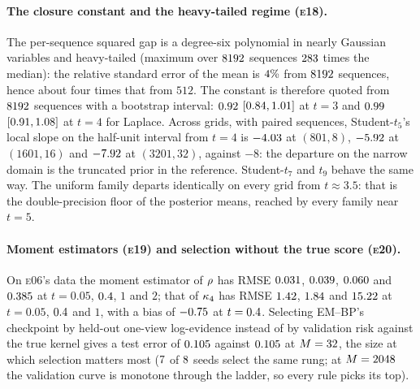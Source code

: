 \paragraph{The closure constant and the heavy-tailed regime (\textsc{e18}).}
The per-sequence squared gap is a degree-six polynomial in nearly Gaussian variables and
heavy-tailed (maximum over $8192$ sequences
$283$ times the median): the relative standard error of
the mean is $4\%$ from $8192$ sequences, hence about
four times that from $512$. The constant is therefore quoted from $8192$
sequences with a bootstrap interval:
$0.92$ $[0.84,1.01]$ at
$t=3$ and $0.99$ $[0.91,1.08]$
at $t=4$ for Laplace. Across grids, with paired sequences, Student-$t_5$'s local slope
on the half-unit interval from $t=4$ is $-4.03$ at $(801,8)$,
$-5.92$ at $(1601,16)$ and
$-7.92$ at $(3201,32)$, against $-8$: the
departure on the narrow domain is the truncated prior in the reference. Student-$t_7$ and
$t_9$ behave the same way. The uniform family departs identically on every grid from
$t\approx3.5$: that is the double-precision floor of the posterior means, reached by every
family near $t=5$.

\paragraph{Moment estimators (\textsc{e19}) and selection without the true score (\textsc{e20}).}
On \textsc{e06}'s data the moment estimator of $\rho$ has RMSE
$0.031$, $0.039$, $0.060$ and
$0.385$ at $t=0.05$, $0.4$, $1$ and $2$; that of $\kappa_4$ has
RMSE $1.42$, $1.84$ and
$15.22$ at $t=0.05$, $0.4$ and $1$, with a bias of
$-0.75$ at $t=0.4$. Selecting EM--BP's checkpoint by held-out
one-view log-evidence instead of by validation risk against the true kernel gives a test
error of $0.105$ against $0.105$ at $M=32$, the size at which
selection matters most ($7$ of $8$ seeds select the same rung; at
$M=2048$ the validation curve is monotone through the ladder, so every rule picks its
top).


